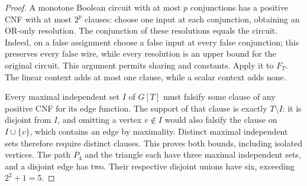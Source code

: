 \documentclass[11pt]{article}
\theoremstyle{definition}
\theoremstyle{remark}
\begin{document}
\begin{proof}
A monotone Boolean circuit with at most $p$ conjunctions has a positive CNF with at most $2^p$ clauses: choose one input at each conjunction, obtaining an OR-only resolution. The conjunction of these resolutions equals the circuit. Indeed, on a false assignment choose a false input at every false conjunction; this preserves every false wire, while every resolution is an upper bound for the original circuit. This argument permits sharing and constants. Apply it to $F_T$. The linear context adds at most one clause, while a scalar context adds none.

Every maximal independent set $I$ of $G[T]$ must falsify some clause of any positive CNF for its edge function. The support of that clause is exactly $T\setminus I$: it is disjoint from $I$, and omitting a vertex $v\notin I$ would also falsify the clause on $I\cup\{v\}$, which contains an edge by maximality. Distinct maximal independent sets therefore require distinct clauses. This proves both bounds, including isolated vertices. The path $P_4$ and the triangle each have three maximal independent sets, and a disjoint edge has two. Their respective disjoint unions have six, exceeding $2^2+1=5$.
\end{proof}
\end{document}
